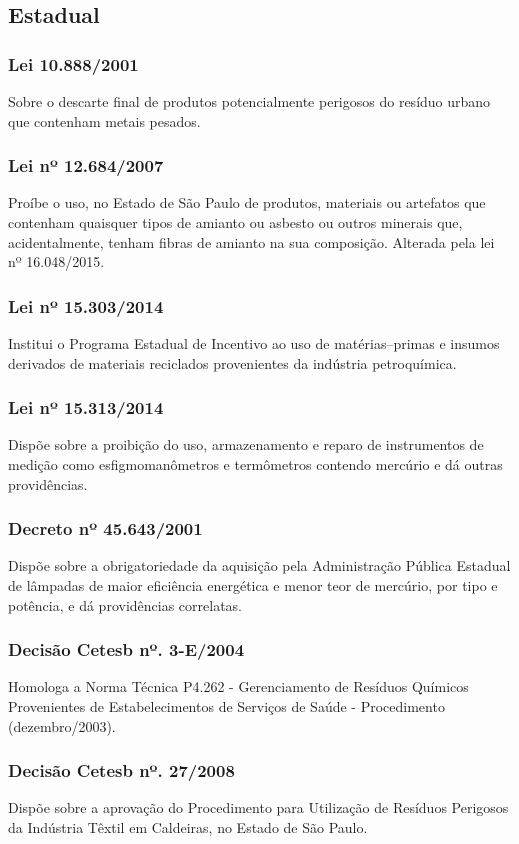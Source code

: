 \begin{subapend}
	\subsection{Estadual}
	\begin{subsubapend}
		\item \subsubsection{Lei 10.888/2001}
		Sobre o descarte final de produtos potencialmente perigosos do resíduo urbano que contenham metais pesados.
		\subsubsection{Lei nº 12.684/2007}
		Proíbe o uso, no Estado de São Paulo de produtos, materiais ou artefatos que contenham quaisquer tipos de amianto ou asbesto ou outros minerais que, acidentalmente, tenham fibras de amianto na sua composição. Alterada pela lei nº 16.048/2015.
		\subsubsection{Lei nº 15.303/2014}
		Institui o Programa Estadual de Incentivo ao uso de matérias–primas e insumos derivados de materiais reciclados provenientes da indústria petroquímica.
		\subsubsection{Lei nº 15.313/2014}
		Dispõe sobre a proibição do uso, armazenamento e reparo de instrumentos de medição como esfigmomanômetros e termômetros contendo mercúrio e dá outras providências.
		\subsubsection{Decreto nº 45.643/2001}
		Dispõe sobre a obrigatoriedade da aquisição pela Administração Pública Estadual de lâmpadas de maior eficiência energética e menor teor de mercúrio, por tipo e potência, e dá providências correlatas.
		\subsubsection{Decisão Cetesb nº. 3-E/2004}
		Homologa a Norma Técnica P4.262 - Gerenciamento de Resíduos Químicos Provenientes de Estabelecimentos de Serviços de Saúde - Procedimento (dezembro/2003).
		\subsubsection{Decisão Cetesb nº. 27/2008}
		Dispõe sobre a aprovação do Procedimento para Utilização de Resíduos Perigosos da Indústria Têxtil em Caldeiras, no Estado de São Paulo.

\end{subsubapend}
\end{subapend}
